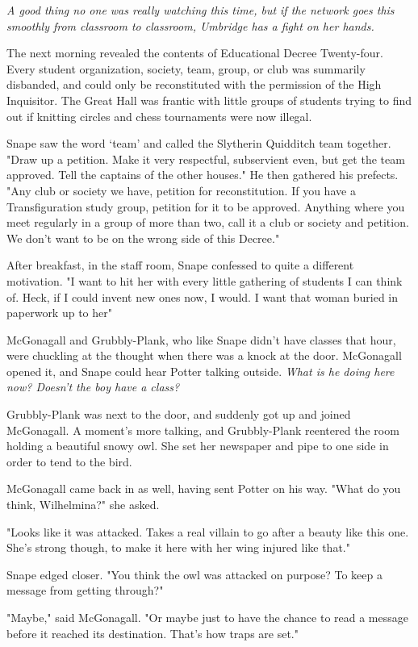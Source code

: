 \emph{A good thing no one was really watching this time, but if the network goes this smoothly from classroom to classroom, Umbridge has a fight on her hands.}

The next morning revealed the contents of Educational Decree Twenty-four. Every student organization, society, team, group, or club was summarily disbanded, and could only be reconstituted with the permission of the High Inquisitor. The Great Hall was frantic with little groups of students trying to find out if knitting circles and chess tournaments were now illegal.

Snape saw the word `team' and called the Slytherin Quidditch team together. "Draw up a petition. Make it very respectful, subservient even, but get the team approved. Tell the captains of the other houses." He then gathered his prefects. "Any club or society we have, petition for reconstitution. If you have a Transfiguration study group, petition for it to be approved. Anything where you meet regularly in a group of more than two, call it a club or society and petition. We don't want to be on the wrong side of this Decree."

After breakfast, in the staff room, Snape confessed to quite a different motivation. "I want to hit her with every little gathering of students I can think of. Heck, if I could invent new ones now, I would. I want that woman buried in paperwork up to her{\el}"

McGonagall and Grubbly-Plank, who like Snape didn't have classes that hour, were chuckling at the thought when there was a knock at the door. McGonagall opened it, and Snape could hear Potter talking outside. \emph{What is he doing here now? Doesn't the boy have a class?}

Grubbly-Plank was next to the door, and suddenly got up and joined McGonagall. A moment's more talking, and Grubbly-Plank reentered the room holding a beautiful snowy owl. She set her newspaper and pipe to one side in order to tend to the bird.

McGonagall came back in as well, having sent Potter on his way. "What do you think, Wilhelmina?" she asked.

"Looks like it was attacked. Takes a real villain to go after a beauty like this one. She's strong though, to make it here with her wing injured like that."

Snape edged closer. "You think the owl was attacked on purpose? To keep a message from getting through?"

"Maybe," said McGonagall. "Or maybe just to have the chance to read a message before it reached its destination. That's how traps are set."

